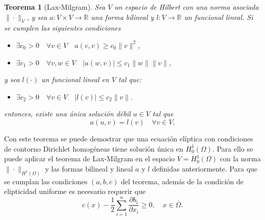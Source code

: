 \documentclass[a4paper,11pt,spanish, twoside, leqno]{tfg-uam}
\newtheorem{teor}{Teorema}[chapter]
\theoremstyle{definition}
\begin{document}
\begin{teor}[Lax-Milgram]
    Sea $V$ un espacio de Hilbert con una norma asociada $\|\cdot\|_V$, y sea $a:V\times V\rightarrow\mathbb{R}$ una forma bilineal y $l:V\rightarrow\mathbb{R}$ un funcional lineal. Si se cumplen las siguientes condiciones
    \begin{itemize}
        \item[(a)] $\exists c_0 > 0 \quad \forall v \in V \quad a(v,v) \geq c_0\|v\|^2$,
        \item[(b)] $\exists c_1 > 0 \quad \forall v, w \in V \quad |a(w,v)| \leq c_1\|w\|\|v\|$,
    \end{itemize}
    y sea $l(\cdot)$ un funcional lineal en $V$ tal que:
    \begin{itemize}
        \item[(c)] $\exists c_2 > 0 \quad \forall v \in V \quad |l(v)| \leq c_2\|v\|$.
    \end{itemize}
    entonces, existe una única solución débil $u\in V$ tal que
    \begin{equation*}
        a(u,v) = l(v) \quad \forall v\in V.
    \end{equation*}
\end{teor}
Con este teorema se puede demostrar que una ecuación elíptica con condiciones de contorno Dirichlet homogéneas tiene solución única en $H^1_0(\Omega)$. Para ello se puede aplicar el teorema de Lax-Milgram en el espacio $V=H^1_0(\Omega)$ con la norma $\|\cdot\|_{H^1(\Omega)}$ y las formas bilineal y lineal $a$ y $l$ definidas anteriormente. Para que se cumplan las condiciones $(a,b,c)$ del teorema, además de la condición de elipticidad uniforme es necesario requerir que
\begin{equation}\label{eq:condiciones_LaxMilgram_extra}
    c(x) - \frac{1}{2} \sum_{i=1}^n \frac{\partial b_i}{\partial x_i} \geq 0, \quad x \in \overline{\Omega}.
\end{equation}
\end{document}
